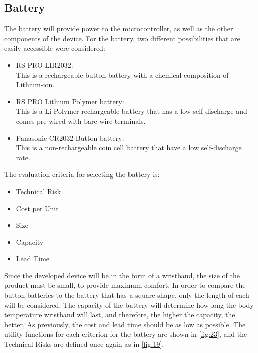 \subsection{Battery} 
The battery will provide power to the microcontroller, as well as the other components of the device. For the battery, two different possibilities that are easily accessible were considered:
\begin{itemize}
	\item RS PRO LIR2032:\\
	This is a rechargeable button battery with a chemical composition of Lithium-ion.
	\item RS PRO Lithium Polymer battery:\\
	This is a Li-Polymer rechargeable battery that has a low self-discharge and comes pre-wired with bare wire terminals.
	\item Panasonic CR2032 Button battery:\\
	This is a non-rechargeable coin cell battery that have a low self-discharge rate.
\end{itemize}
\noindent
The evaluation criteria for selecting the battery is:
\begin{itemize}[noitemsep]
	\item Technical Risk
	\item Cost per Unit
	\item Size
	\item Capacity
	\item Lead Time
\end{itemize}
\noindent
Since the developed device will be in the form of a wristband, the size of the product must be small, to provide maximum comfort. In order to compare the button batteries to the battery that has a square shape, only the length of each will be considered. The capacity of the battery will determine how long the body temperature wristband will last, and therefore, the higher the capacity, the better. As previously, the cost and lead time should be as low as possible. The utility functions for each criterion for the battery are shown in \autoref{fig:23}, and the Technical Risks are defined once again as in \autoref{fig:19}.
